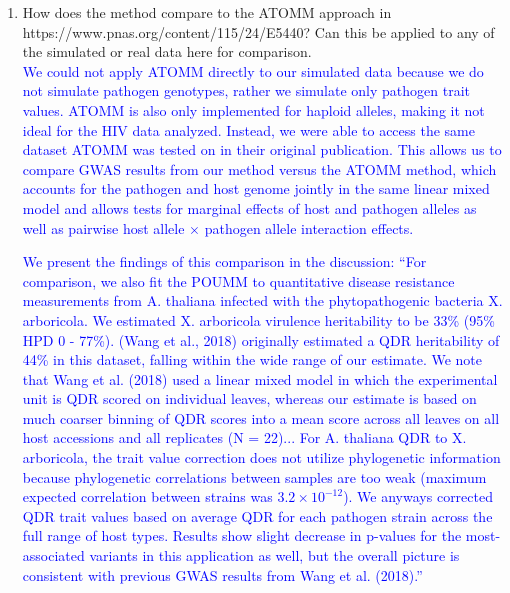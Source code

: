 \documentclass[11pt]{article}
\begin{document}
\begin{enumerate}
    \item How does the method compare to the ATOMM approach in https://www.pnas.org/content/115/24/E5440? Can this be applied to any of the simulated or real data here for comparison. \\
    \textcolor{blue}{We could not apply ATOMM directly to our simulated data because we do not simulate pathogen genotypes, rather we simulate only pathogen trait values. ATOMM is also only implemented for haploid alleles, making it not ideal for the HIV data analyzed. Instead, we were able to access the same dataset ATOMM was tested on in their original publication. This allows us to compare GWAS results from our method versus the ATOMM method, which accounts for the pathogen and host genome jointly in the same linear mixed model and allows tests for marginal effects of host and pathogen alleles as well as pairwise host allele $\times$ pathogen allele interaction effects.}
    
    \textcolor{blue}{We present the findings of this comparison in the discussion: ``For comparison, we also fit the POUMM to quantitative disease resistance measurements from A. thaliana infected with the phytopathogenic bacteria X. arboricola. We estimated X. arboricola virulence heritability to be 33\% (95\% HPD 0 - 77\%). (Wang et al., 2018) originally estimated a QDR heritability of 44\% in this dataset, falling within the wide range of our estimate. We note that Wang et al. (2018) used a linear mixed model in which the experimental unit is QDR scored on individual leaves, whereas our estimate is based on much coarser binning of QDR scores into a mean score across all leaves on all host accessions and all replicates (N = 22)... For A. thaliana QDR to X. arboricola, the trait value correction does not utilize phylogenetic information because phylogenetic correlations between samples are too weak (maximum expected correlation between strains was $3.2 \times 10^{-12}$). We anyways corrected QDR trait values based on average QDR for each pathogen strain across the full range of host types. Results show slight decrease in p-values for the most-associated variants in this application as well, but the overall picture is consistent with previous GWAS results from Wang et al. (2018).''}
    

\end{enumerate}
\end{document}
